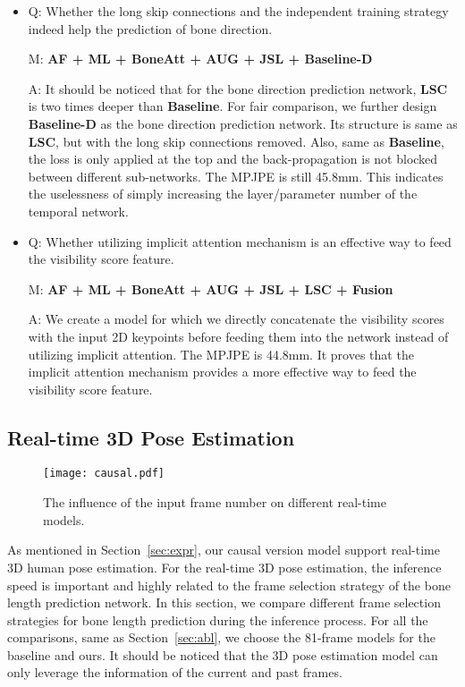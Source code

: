 \documentclass[journal]{IEEEtran}
\begin{document}
\begin{itemize}[leftmargin=0.2in]
\vspace{-0.00in}




\item 
Q: Whether the long skip connections and the independent training strategy indeed help the prediction of bone direction.

M: \textbf{AF + ML + BoneAtt + AUG + JSL + Baseline-D} 

A: It should be noticed that for the bone direction prediction network, \textbf{LSC} is two times deeper than \textbf{Baseline}. For fair comparison, we further design \textbf{Baseline-D} as the bone direction prediction network. Its structure is same as \textbf{LSC}, but with the long skip connections removed. Also, same as \textbf{Baseline}, the loss is only applied at the top and the back-propagation is not blocked between different sub-networks. The MPJPE is still 45.8mm. This indicates the uselessness of simply increasing the layer/parameter number of the temporal network.
\vspace{-0.00in}


\item 

Q: Whether utilizing implicit attention mechanism is an effective way to feed the visibility score feature.

M: \textbf{AF + ML + BoneAtt + AUG + JSL + LSC + Fusion}

A: We create a model for which we directly concatenate the visibility scores with the input 2D keypoints before feeding them into the network instead of utilizing implicit attention. The MPJPE is 44.8mm. It proves that the implicit attention mechanism provides a more effective way to feed the visibility score feature.

\end{itemize}


\subsection{Real-time 3D Pose Estimation}

\begin{figure}
\centering
\texttt{[image: causal.pdf]}
\caption{The influence of the input frame number  on different real-time models.}
\vspace{-1mm}
\label{fig:causal}

\end{figure}


As mentioned in Section~\ref{sec:expr}, our causal version model support real-time 3D human pose estimation. For the real-time 3D pose estimation, the inference speed is important and highly related to the frame selection strategy of the bone length prediction network. In this section, we compare different frame selection strategies for bone length prediction during the inference process. For all the comparisons,  same as Section~\ref{sec:abl}, we choose the 81-frame models for the baseline \cite{pavllo20193d} and ours. It should be noticed that the 3D pose estimation model can only leverage the information of the current and past frames. 
\end{document}
